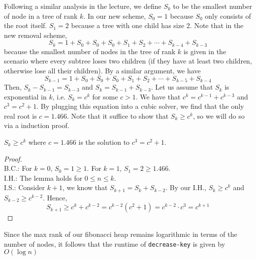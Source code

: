 \documentclass[a4paper]{/home/dawei/.dotfiles/templates/preamble}
\begin{document}
Following a similar analysis in the lecture, we define $S_k$ to be the smallest
number of node in a tree of rank $k$. In our new scheme, $S_0 = 1$ because
$S_0$ only consists of the root itself. $S_1 = 2$ because a tree with one child
has size 2. Note that in the new removal scheme,
\[
  S_k = 1 + S_0 + S_0 + S_0 + S_1 + S_2 + \cdots + S_{k-4} + S_{k-3}
\]
because the smallest number of nodes in the tree of rank $k$ is given in the
scenario where every subtree loses two children (if they have at least two
children, otherwise lose all their children). By a similar argument, we have
\[
  S_{k-1} = 1 + S_0 + S_0 + S_0 + S_1 + S_2 + \cdots + S_{k-5} + S_{k-4}
\]
Then, $S_k - S_{k-1} = S_{k-3}$ and $S_{k} = S_{k-1} + S_{k-3}$. Let us assume
that $S_k$ is exponential in $k$, i.e. $S_k = c^k$ for some $c > 1$.
We have that $c^k = c^{k-1} + c^{k-3}$ and $c^3 = c^2 + 1$. By plugging this
equation into a cubic solver, we find that the only real root is $c = 1.466$.
Note that it suffice to show that $S_k \ge c^k$, so we will do so via
a induction proof.
\begin{lemma}{}{}
  $S_k \ge c^k$ where $c = 1.466$ is the solution to $c^3 = c^2 + 1$.
\end{lemma}
\begin{proof}{}{} \\
  B.C.: For $k = 0$, $S_0 = 1 \ge 1$. For $k = 1$, $S_1 = 2 \ge 1.466$. \\
  I.H.: The lemma holds for $0 \le n \le k$. \\
  I.S.: Consider $k+1$, we know that $S_{k+1} = S_{k} + S_{k-2}$.
  By our I.H., $S_k \ge c^k$ and $S_{k-2} \ge c^{k-2}$.
  Hence, 
  \[
    S_{k+1} \ge c^k + c^{k-2} = c^{k-2}(c^{2} + 1) = c^{k-2} \cdot c^{3} = c^{k+1}
  \]
\end{proof}
Since the max rank of our fibonacci heap remains logarithmic in terms of the number of nodes,
it follows that the runtime of \texttt{decrease-key} is given by $O(\log{n})$
\end{document}
